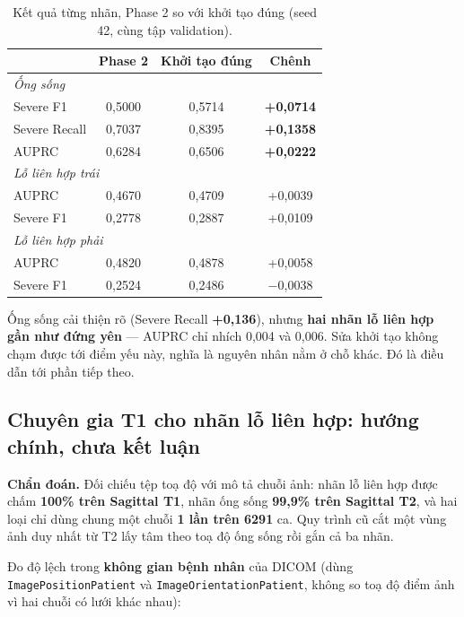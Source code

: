 \documentclass[11pt,a4paper]{article}
\newcommand{\up}[1]{\textcolor{teal!70!black}{\textbf{#1}}}
\newcommand{\down}[1]{\textcolor{red!65!black}{#1}}
\begin{document}
\begin{table}[htbp]
\centering\small
\caption{Kết quả từng nhãn, Phase 2 so với khởi tạo đúng (seed 42, cùng tập validation).}
\label{tab:percond}
\begin{tabular}{lccc}
\toprule
 & \textbf{Phase 2} & \textbf{Khởi tạo đúng} & \textbf{Chênh} \\
\midrule
\multicolumn{4}{l}{\textit{Ống sống}} \\
\quad Severe F1      & 0{,}5000 & 0{,}5714 & \up{+0{,}0714} \\
\quad Severe Recall  & 0{,}7037 & 0{,}8395 & \up{+0{,}1358} \\
\quad AUPRC          & 0{,}6284 & 0{,}6506 & \up{+0{,}0222} \\
\midrule
\multicolumn{4}{l}{\textit{Lỗ liên hợp trái}} \\
\quad AUPRC          & 0{,}4670 & 0{,}4709 & +0{,}0039 \\
\quad Severe F1      & 0{,}2778 & 0{,}2887 & +0{,}0109 \\
\midrule
\multicolumn{4}{l}{\textit{Lỗ liên hợp phải}} \\
\quad AUPRC          & 0{,}4820 & 0{,}4878 & +0{,}0058 \\
\quad Severe F1      & 0{,}2524 & 0{,}2486 & \down{$-$0{,}0038} \\
\bottomrule
\end{tabular}
\end{table}

Ống sống cải thiện rõ (Severe Recall \up{+0{,}136}), nhưng \textbf{hai nhãn lỗ liên hợp gần như
đứng yên} --- AUPRC chỉ nhích 0{,}004 và 0{,}006. Sửa khởi tạo không chạm được tới điểm yếu này,
nghĩa là nguyên nhân nằm ở chỗ khác. Đó là điều dẫn tới phần tiếp theo.

\subsection{Chuyên gia T1 cho nhãn lỗ liên hợp: hướng chính, chưa kết luận}
\label{sec:t1}

\textbf{Chẩn đoán.} Đối chiếu tệp toạ độ với mô tả chuỗi ảnh: nhãn lỗ liên hợp được chấm
\textbf{100\% trên Sagittal T1}, nhãn ống sống \textbf{99{,}9\% trên Sagittal T2}, và hai loại
chỉ dùng chung một chuỗi \textbf{1 lần trên 6291} ca. Quy trình cũ cắt một vùng ảnh duy nhất từ
T2 lấy tâm theo toạ độ ống sống rồi gắn cả ba nhãn.

Đo độ lệch trong \textbf{không gian bệnh nhân} của DICOM (dùng \texttt{ImagePositionPatient} và
\texttt{ImageOrientationPatient}, không so toạ độ điểm ảnh vì hai chuỗi có lưới khác nhau):
\end{document}

